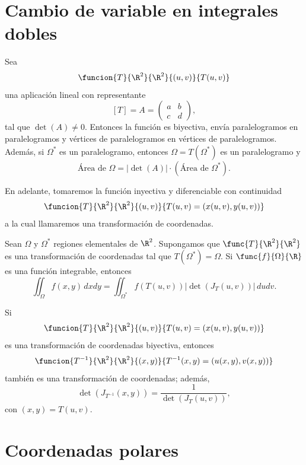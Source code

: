\documentclass[a4,11pt]{aleph-notas}
\begin{document}
\encabezado

\section{Cambio de variable en integrales dobles}

\begin{advertencia}
    Sea
    \[
        \funcion{T}{\R^2}{\R^2}{(u,v)}{T(u,v)}
    \]
    una aplicación lineal con representante
    \[
        [T]= A =\begin{pmatrix}
            a & b \\
            c & d
          \end{pmatrix},
    \]
    tal que $\det(A)\neq 0$. Entonces la función es biyectiva, envía paralelogramos en paralelogramos y vértices de paralelogramos en vértices de paralelogramos. Además, si $\Omega^*$ es un paralelogramo, entonces $\Omega=T(\Omega^*)$ es un paralelogramo y
    \[
        \text{Área de } \Omega = |\det(A)| \cdot (\text{Área de } \Omega^*).
    \]
\end{advertencia}

En adelante, tomaremos la función inyectiva y diferenciable con continuidad
\[
    \funcion{T}{\R^2}{\R^2}{(u,v)}{T(u,v)=(x(u,v),y(u,v))}
\]
a la cual llamaremos una transformación de coordenadas.

\begin{prop}
    Sean $\Omega$ y $\Omega^*$ regiones elementales de $\R^2$. Supongamos que $\func{T}{\R^2}{\R^2}$ es una transformación de coordenadas tal que $T(\Omega^*)=\Omega$. Si $\func{f}{\Omega}{\R}$ es una función integrable, entonces
    \[
        \iint_\Omega f(x,y)\, dxdy = \iint_{\Omega^*} f(T(u,v)) |\det(J_T(u,v))| \, dudv.
    \]
\end{prop}

\begin{advertencia}
    Si
    \[
        \funcion{T}{\R^2}{\R^2}{(u,v)}{T(u,v)=(x(u,v),y(u,v))}
    \]
    es una transformación de coordenadas biyectiva, entonces
    \[
        \funcion{T^{-1}}{\R^2}{\R^2}{(x,y)}{T^{-1}(x,y)=(u(x,y),v(x,y))}
    \]
    también es una transformación de coordenadas; además,
    \[
        \det(J_{T^{-1}}(x,y)) = \frac{1}{\det(J_{T}(u,v))},
    \]
    con $(x,y)=T(u,v)$.
\end{advertencia}

\section{Coordenadas polares}
\end{document}
